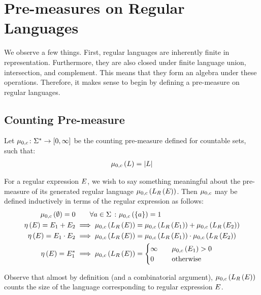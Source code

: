 \section{Pre-measures on Regular Languages}
We observe a few things.
First, regular languages are inherently finite in representation.
Furthermore, they are also closed under finite language union,
intersection, and complement.
This means that they form an algebra under these operations.
Therefore, it makes sense to begin by defining a pre-measure on
regular languages.

\subsection{Counting Pre-measure}
Let \(\mu_{0, c} \colon \Sigma^\ast \rightarrow \left[0, \infty\right]\)
be the counting pre-measure defined for countable sets,
such that:
\begin{align*}
  \mu_{0, c}\left(L\right) = \left\lvert L\right\rvert
\end{align*}

For a regular expression \(E\),
we wish to say something meaningful about the pre-measure of its
generated regular language
\(\mu_{0, c}\left(L_{R}\left(E\right)\right)\).
Then \(\mu_{0, c}\) may be defined inductively in terms of
the regular expression as follows:
\begin{align*}
  \mu_{0, c}\left(\emptyset\right) = 0
    &\qquad \forall a \in \Sigma \ \colon \mu_{0, c}\left(\left\{a\right\}\right) = 1 \\
  \eta\left(E\right) = E_1 + E_2
    &\implies
      \mu_{0, c}\left(L_{R}\left(E\right)\right) =
        \mu_{0, c}\left(L_{R}\left(E_1\right)\right) +
        \mu_{0, c}\left(L_{R}\left(E_2\right)\right) \\
  \eta\left(E\right) = E_1 \cdot E_2
    &\implies
      \mu_{0, c}\left(L_{R}\left(E\right)\right) =
        \mu_{0, c}\left(L_{R}\left(E_1\right)\right) \cdot
        \mu_{0, c}\left(L_{R}\left(E_2\right)\right) \\
  \eta\left(E\right) = E_1 ^\ast
    &\implies
      \mu_{0, c}\left(L_{R}\left(E\right)\right)
        = \begin{cases}
            \infty & \quad \mu_{0, c}\left(E_1\right) > 0 \\
            0 & \quad \text{otherwise}
          \end{cases}
\end{align*}

Observe that almost by definition (and a combinatorial argument),
\(\mu_{0, c}\left(L_{R}\left(E\right)\right)\) counts the size of
the language corresponding to regular expression \(E\).

